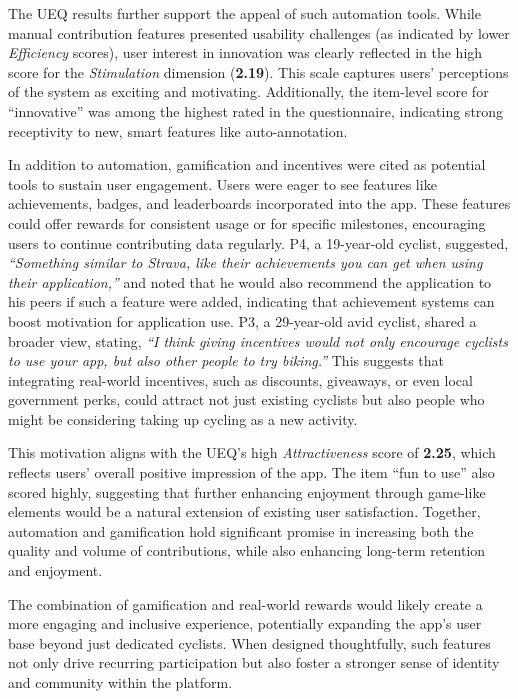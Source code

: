 The UEQ results further support the appeal of such automation tools. While manual contribution features presented usability challenges (as indicated by lower \textit{Efficiency} scores), user interest in innovation was clearly reflected in the high score for the \textit{Stimulation} dimension (\textbf{2.19}). This scale captures users' perceptions of the system as exciting and motivating. Additionally, the item-level score for “innovative” was among the highest rated in the questionnaire, indicating strong receptivity to new, smart features like auto-annotation.

In addition to automation, gamification and incentives were cited as potential tools to sustain user engagement. Users were eager to see features like achievements, badges, and leaderboards incorporated into the app. These features could offer rewards for consistent usage or for specific milestones, encouraging users to continue contributing data regularly. P4, a 19-year-old cyclist, suggested, \textit{``Something similar to Strava, like their achievements you can get when using their application,''} and noted that he would also recommend the application to his peers if such a feature were added, indicating that achievement systems can boost motivation for application use. P3, a 29-year-old avid cyclist, shared a broader view, stating, \textit{``I think giving incentives would not only encourage cyclists to use your app, but also other people to try biking.''} This suggests that integrating real-world incentives, such as discounts, giveaways, or even local government perks, could attract not just existing cyclists but also people who might be considering taking up cycling as a new activity.

This motivation aligns with the UEQ's high \textit{Attractiveness} score of \textbf{2.25}, which reflects users' overall positive impression of the app. The item “fun to use” also scored highly, suggesting that further enhancing enjoyment through game-like elements would be a natural extension of existing user satisfaction. Together, automation and gamification hold significant promise in increasing both the quality and volume of contributions, while also enhancing long-term retention and enjoyment.

The combination of gamification and real-world rewards would likely create a more engaging and inclusive experience, potentially expanding the app's user base beyond just dedicated cyclists. When designed thoughtfully, such features not only drive recurring participation but also foster a stronger sense of identity and community within the platform.

